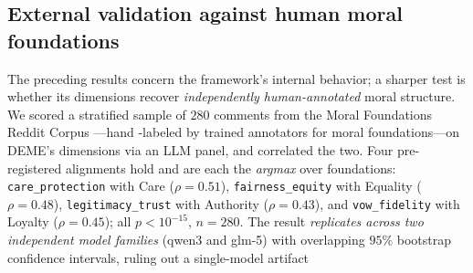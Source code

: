 \subsection{External validation against human moral foundations}
The preceding results concern the framework's internal behavior; a sharper test is whether its
dimensions recover \emph{independently human-annotated} moral structure. We scored a stratified
sample of $280$ comments from the Moral Foundations Reddit Corpus \citep{trager2022mfrc}---hand
-labeled by trained annotators for moral foundations---on DEME's dimensions via an LLM panel,
and correlated the two. Four pre-registered alignments hold and are each the \emph{argmax}
over foundations: \texttt{care\_protection} with Care ($\rho=0.51$), \texttt{fairness\_equity}
with Equality ($\rho=0.48$), \texttt{legitimacy\_trust} with Authority ($\rho=0.43$), and
\texttt{vow\_fidelity} with Loyalty ($\rho=0.45$); all $p<10^{-15}$, $n=280$.
The result
\emph{replicates across two independent model families} (qwen3 and glm-5) with overlapping
$95\%$ bootstrap confidence intervals, ruling out a single-model artifact

